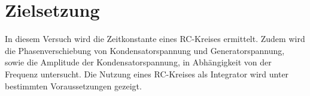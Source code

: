 \section{Zielsetzung}

\label{sec:Zielsetzung}

In diesem Versuch wird die Zeitkonstante eines RC-Kreises ermittelt. Zudem wird die
Phasenverschiebung von Kondensatorspannung und Generatorspannung, sowie
die Amplitude der Kondensatorspannung, in Abhängigkeit von der Frequenz untersucht.
Die Nutzung eines RC-Kreises als Integrator wird unter bestimmten Voraussetzungen gezeigt.
